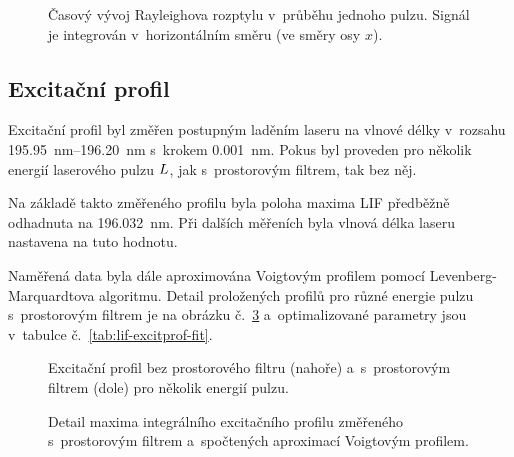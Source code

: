 \begin{figure}
	\centerline{}
	\caption{Časový vývoj Rayleighova rozptylu v~průběhu jednoho pulzu.
		Signál je integrován v~horizontálním směru (ve směry osy $x$).}
	\label{fig:lif-rayleigh-time}
\end{figure}

\subsection{Excitační profil}
\label{sec:lif-excitprof}
Excitační profil byl změřen postupným laděním laseru na vlnové délky
v~rozsahu \SIrange{195.95}{196.20}{\nano\metre}
s~krokem \SI{0.001}{\nano\metre}.
Pokus byl proveden pro několik energií laserového pulzu $L$,
jak s~prostorovým filtrem, tak bez něj.

Na základě takto změřeného profilu byla poloha maxima LIF předběžně
odhadnuta na \SI{196.032}{\nano\metre}.
Při dalších měřeních byla vlnová délka laseru na\-stavena na tuto hodnotu.

Naměřená data byla dále aproximována Voigtovým profilem pomocí
Le\-ven\-berg-Marquardtova algoritmu.
Detail proložených profilů pro různé energie pulzu s~prostorovým filtrem
je na obrázku č.~\ref{fig:lif-excitprof-fit}
a~optimalizované parametry jsou v~tabulce č.~\ref{tab:lif-excitprof-fit}.

\begin{figure}
	\centering
	
	\bigskip\par
	
	\caption{Excitační profil bez prostorového filtru (nahoře)
		a~s~prostorovým filtrem (dole) pro několik energií pulzu.}
	\label{fig:lif-excitprof-filter}
\end{figure}

\begin{figure}
	\centering
	
	\caption{Detail maxima integrálního excitačního profilu
		změřeného s~prostorovým filtrem
		a~spočtených aproximací Voigtovým profilem.}
	\label{fig:lif-excitprof-fit}
\end{figure}

